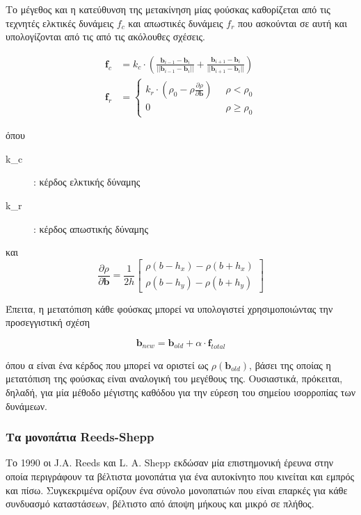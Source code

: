 \bigskip
Το μέγεθος και η κατεύθυνση της μετακίνηση μίας φούσκας καθορίζεται από τις τεχνητές ελκτικές  δυνάμεις $f_c$ και απωστικές δυνάμεις $f_r$ που ασκούνται σε αυτή και υπολογίζονται από τις από τις ακόλουθες σχέσεις.

\begin{align}
	\mathbf{f}_c &= k_c \cdot \left( \frac{\mathbf{b}_{i-1} - \mathbf{b}_i}{||\mathbf{b}_{i-1} - \mathbf{b}_i||} + \frac{\mathbf{b}_{i+1} - \mathbf{b}_i}{||\mathbf{b}_{i+1} - \mathbf{b}_i||}  \right)\\[1cm]
	\mathbf{f}_r &= \begin{cases}
				k_r \cdot \left(\rho_0 - \rho \frac{\partial\rho}{\partial \mathbf{b}}\right) \;\; &\rho < \rho_0\\
				0 \;\; &\rho \geq \rho_0
			 \end{cases}
\end{align}

\noindent όπου
\begin{description}
	\item[k_c]: κέρδος ελκτικής δύναμης
	\item[k_r]: κέρδος απωστικής δύναμης
\end{description}

\noindent και
\begin{equation}
	\frac{\partial\rho}{\partial \mathbf{b}} = \frac{1}{2h}
	\begin{bmatrix}
		\rho(b-h_x) - \rho(b+h_x)\\[0.5cm]
		\rho(b-h_y) - \rho(b+h_y)
	\end{bmatrix}
\end{equation}

Έπειτα, η μετατόπιση κάθε φούσκας μπορεί να υπολογιστεί χρησιμοποιώντας την προσεγγιστική σχέση 

\begin{equation}
	\mathbf{b}_{new} = \mathbf{b}_{old} + \alpha \cdot \mathbf{f}_{total} 
\end{equation}

\noindent όπου α είναι ένα κέρδος που μπορεί να οριστεί ως $\rho(\mathbf{b}_{old})$, βάσει της οποίας η μετατόπιση της φούσκας είναι αναλογική του μεγέθους της. Ουσιαστικά, πρόκειται, δηλαδή, για μία μέθοδο μέγιστης καθόδου για την εύρεση του σημείου ισορροπίας των δυνάμεων.



\subsubsection{Τα μονοπάτια Reeds-Shepp}\label{sssec:reeds_shepp}
Το 1990 οι J.A. Reeds και L. A. Shepp εκδώσαν μία επιστημονική έρευνα \cite{reeds_shepp} στην οποία περιγράφουν τα βέλτιστα μονοπάτια για ένα αυτοκίνητο που κινείται και εμπρός και πίσω. Συγκεκριμένα ορίζουν ένα σύνολο μονοπατιών που είναι επαρκές για κάθε συνδυασμό καταστάσεων, βέλτιστο από άποψη μήκους και μικρό σε πλήθος.


